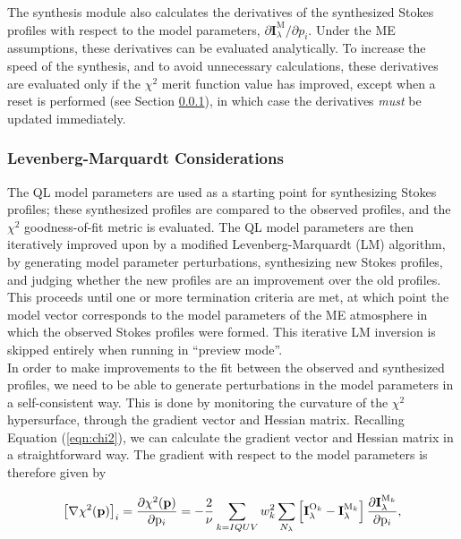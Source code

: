 \documentclass[11pt]{article}
\begin{document}
The synthesis module also calculates the derivatives of the synthesized Stokes profiles with
respect to the model parameters, $\partial\mathbf{I}_{\lambda}^{\mathrm{M}}/\partial p_{i}$.  Under the
ME assumptions, these derivatives can be evaluated analytically.  To increase the speed of the
synthesis, and to avoid unnecessary calculations, these derivatives are evaluated only if the
$\chi^{2}$ merit function value has improved, except when a reset is performed (see Section \ref{ss:lm}),
in which case the derivatives \textit{must} be updated immediately.


\subsubsection{Levenberg-Marquardt Considerations}\label{ss:lm}
The QL model parameters are used as a starting point for synthesizing Stokes profiles; these 
synthesized profiles are compared to the observed profiles, and the $\chi^{2}$ goodness-of-fit
metric is evaluated.  The QL model parameters are then iteratively improved upon
by a modified Levenberg-Marquardt (LM) algorithm, by generating model parameter perturbations,
synthesizing new Stokes profiles, and judging whether the new profiles are an improvement over
the old profiles.  This proceeds until one or more termination criteria are met, at which point
the model vector corresponds to the model parameters of the ME atmosphere in which the observed
Stokes profiles were formed.  This iterative LM inversion is skipped entirely when running in
``preview mode''.\\

In order to make improvements to the fit between the observed and synthesized profiles, we need to
be able to generate perturbations in the model parameters in a self-consistent way.  This is done
by monitoring the curvature of the $\chi^{2}$ hypersurface, through the gradient vector and 
Hessian matrix.  Recalling Equation (\ref{eqn:chi2}), we can calculate the gradient vector and Hessian
matrix in a straightforward way.  The gradient with respect to the model parameters is therefore
given by

\begin{equation}
\left[\nabla\chi^{2}(\mathbf{p})\right]_{i} = \frac{\partial{\chi^{2}(\mathbf{p})}}{\partial{\mathrm{p}_{i}}} =
-\frac{2}{\nu} \displaystyle\sum\limits_{k=IQUV}w_{k}^{2}\displaystyle\sum\limits_{N_{\lambda}}
\left[\mathbf{I}_{\lambda}^{\mathrm{O}_{k}}-\mathbf{I}_{\lambda}^{\mathrm{M}_{k}}\right]
\frac{\partial{\mathbf{I}_{\lambda}^{\text{M}_{k}}}}{\partial{\mathrm{p}_{i}}},
\end{equation}
\end{document}
